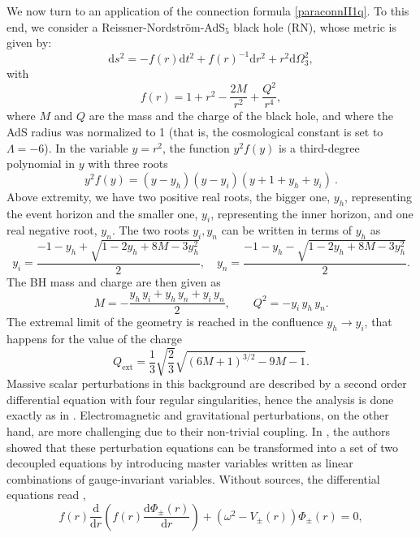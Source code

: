\documentclass[11pt]{article}
\numberwithin{equation}{section}
\newcommand{\be}{\begin{equation}}
\newcommand{\ee}{\end{equation}}
\begin{document}
We now turn to an application of the connection formula \eqref{paraconnII1q}. To this end, we consider a Reissner-Nordstr\"om-AdS$_5$ black hole (RN), whose metric is given by:
\begin{equation}
\mathrm{d}s^2=-f(r)\mathrm{d}t^2+f(r)^{-1}\mathrm{d}r^2+r^2\mathrm{d}\Omega^2_3,
\end{equation}
with
\begin{equation}
f(r)=1+r^2-\frac{2M}{r^2}+\frac{Q^2}{r^4},
\end{equation}
where $M$ and $Q$ are the mass and the charge of the black hole, and where the AdS radius was normalized to 1 (that is, the cosmological constant is set to $\Lambda=-6$). In the variable $y=r^2$, the function $y^2f(y)$ is a third-degree polynomial in $y$ with  three roots 
\be y^2f(y)= (y-y_h)(y-y_i)(y+1+y_h+y_i)~.\ee
Above extremity, we have two positive real roots, the bigger one, $y_h$, representing the event horizon and the smaller one, $y_i$, representing the inner horizon, and one real negative root, $y_n$.  
The two roots $y_i,y_n$ can be written in terms of $y_h$ as
\begin{equation}
y_i=\frac{-1-y_h+\sqrt{1-2y_h+8 M-3 y_h^2}}{2},\quad y_n=\frac{-1-y_h-\sqrt{1-2y_h+8 M-3 y_h^2}}{2}.
\end{equation}
The BH mass and charge are then given as
 \be M=-\frac{y_h\,y_i+y_h\,y_n+y_i\,y_n}{2} , \qquad Q^2=-y_i\,y_h\,y_n.\ee
The extremal limit of the geometry is reached in the confluence $y_h\to y_i$, that happens for the value of the charge
\begin{equation}
Q_{\text{ext}}=\frac{1}{3} \sqrt{\frac{2}{3}} \sqrt{(6 M+1)^{3/2}-9 M-1}.
\end{equation}
%
%
Massive scalar perturbations in this background are described by a second order differential equation with four regular singularities, hence the analysis is done exactly as in \cite{Dodelson:2022yvn}. 
Electromagnetic and gravitational perturbations, on the other hand, are more challenging due to their non-trivial coupling. In \cite{Kodama:2003kk, Kodama:2007ph}, the authors showed that these perturbation equations can be transformed into a set of two decoupled equations by introducing master variables written as linear combinations of gauge-invariant variables. Without sources, the differential equations read \cite[eqs. (4.25)-(4.29)]{Kodama:2007ph}, \cite[eq.~(4.37)]{Kodama:2003kk}
\begin{equation}\label{eq:masterRN}
f(r)\frac{\mathrm{d} }{\mathrm{d} r}\left(f(r) \frac{\mathrm{d} \Phi_{\pm} (r)}{\mathrm{d} r}\right)+\left(\omega ^2-V_{\pm}(r)\right)\Phi_{\pm} (r)=0,
\end{equation}
\end{document}
